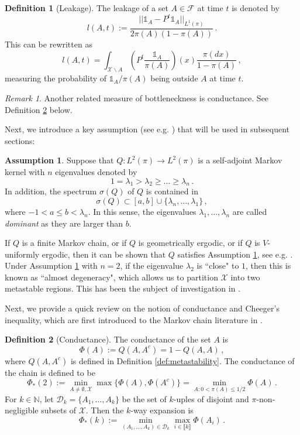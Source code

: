 \documentclass[12pt,a4]{amsart}
\numberwithin{equation}{section}
\theoremstyle{plain}
\theoremstyle{definition}
\newtheorem{definition}{Definition}[section]
\newtheorem{assumption}{Assumption}[section]
\theoremstyle{remark}
\newtheorem{rk}{Remark}[section]
\newcommand{\1}{\mathds{1}}
\renewcommand{\leq}{\leqslant}
\renewcommand{\geq}{\geqslant}
\begin{document}
\begin{definition}[Leakage]
	The leakage of a set $A \in \mathcal{F}$ at time $t$ is denoted by
	$$l(A,t) := \dfrac{||\1_{A} - P^t \1_{A}||_{L^1(\pi)}}{2\pi(A)(1-\pi(A))}\,.$$
	This can be rewritten as
	$$l(A,t) = \int_{\mathcal{X}\backslash A} \left(P^t \dfrac{\1_A}{\pi(A)}\right)(x) \dfrac{\pi(dx)}{1-\pi(A)}\,,$$
	measuring the probability of $\1_A/\pi(A)$ being outside $A$ at time $t$.
\end{definition}

\begin{rk}
	Another related measure of bottleneckness is conductance. See Definition \ref{def:conductance} below.
\end{rk}

Next, we introduce a key assumption (see e.g. \cite{D82, S84, HS06}) that will be used in subsequent sections:

\begin{assumption}\label{assumption}
	Suppose that $Q : L^2(\pi) \rightarrow L^2(\pi)$ is a self-adjoint Markov kernel with $n$  eigenvalues denoted by
	$$1 = \lambda_1 > \lambda_2 \geq \ldots \geq \lambda_n\,.$$
	In addition, the spectrum $\sigma(Q)$ of $Q$ is contained in
	$$\sigma(Q) \subset [a,b] \cup \{\lambda_n,\ldots,\lambda_1\}\,,$$
	where $-1 < a \leq b < \lambda_n$. In this sense, the eigenvalues $\lambda_1,\ldots,\lambda_n$ are called \textit{dominant} as they are larger than $b$.
\end{assumption}

If $Q$ is a finite Markov chain, or if $Q$ is geometrically ergodic, or if $Q$ is $V$-uniformly ergodic, then it can be shown that $Q$ satisfies Assumption \ref{assumption}, see e.g. \cite{HS06, SS13}. Under Assumption \ref{assumption} with $n = 2$, if the eigenvalue $\lambda_2$ is ``close" to $1$, then this is known as ``almost degeneracy", which allows us to partition $\mathcal{X}$ into two metastable regions. This has been the subject of investigation in \cite{D82, S84}.


Next, we provide a quick review on the notion of conductance and Cheeger's inequality, which are first introduced to the Markov chain literature in \cite{DS91}.

\begin{definition}[Conductance]\label{def:conductance}
	The conductance of the set $A$ is
	$$\Phi(A) := Q(A,A^c) = 1 - Q(A,A)\,,$$
	where $Q(A,A^c)$ is defined in Definition \ref{def:metastability}. The conductance of the chain is defined to be
	$$\Phi_*(2) := \min_{A \neq \emptyset,\mathcal{X}} \max \{\Phi(A),\Phi(A^c)\} = \min_{A: 0 < \pi(A) \leq 1/2} \Phi(A)\,.$$
	For $k \in \mathbb{N}$, let $\mathcal{D}_k = \{A_1,\ldots,A_k\}$ be the set of $k$-uples of disjoint and $\pi$-non-negligible subsets of $\mathcal{X}$. Then the $k$-way expansion is 
	$$\Phi_*(k) := \min_{(A_1,\ldots,A_k) \in \mathcal{D}_k} \max_{i \in \llbracket k \rrbracket} \Phi(A_i)\,.$$
\end{definition}
\end{document}
